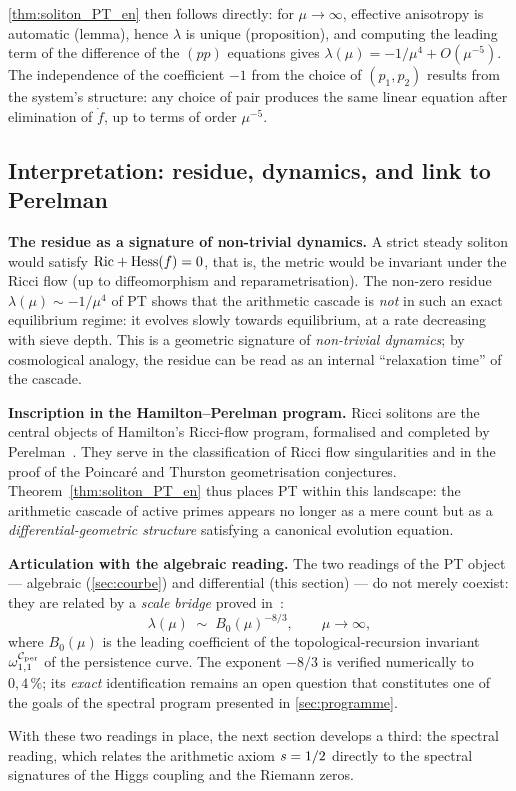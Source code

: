 \ref{thm:soliton_PT_en} then follows directly: for $\mu \to \infty$, effective anisotropy is automatic (lemma), hence $\lambda$ is unique (proposition), and computing the leading term of the difference of the $(pp)$ equations gives $\lambda(\mu) = -1/\mu^{4} + O(\mu^{-5})$. The independence of the coefficient $-1$ from the choice of $(p_1, p_2)$ results from the system's structure: any choice of pair produces the same linear equation after elimination of $\dot f$, up to terms of order $\mu^{-5}$.

\subsection{Interpretation: residue, dynamics, and link to Perelman}
\label{sec:soliton:perelman}

\textbf{The residue as a signature of non-trivial dynamics.}
A strict steady soliton would satisfy $\mathrm{Ric} + \mathrm{Hess}(f) = 0$, that is, the metric would be invariant under the Ricci flow (up to diffeomorphism and reparametrisation). The non-zero residue $\lambda(\mu) \sim -1/\mu^{4}$ of PT shows that the arithmetic cascade is \emph{not} in such an exact equilibrium regime: it evolves slowly towards equilibrium, at a rate decreasing with sieve depth. This is a geometric signature of \emph{non-trivial dynamics}; by cosmological analogy, the residue can be read as an internal ``relaxation time'' of the cascade.

\textbf{Inscription in the Hamilton--Perelman program.}
Ricci solitons are the central objects of Hamilton's Ricci-flow program, formalised and completed by Perelman~\cite{Perelman2002}. They serve in the classification of Ricci flow singularities and in the proof of the Poincaré and Thurston geometrisation conjectures. Theorem~\ref{thm:soliton_PT_en} thus places PT within this landscape: the arithmetic cascade of active primes appears no longer as a mere count but as a \emph{differential-geometric structure} satisfying a canonical evolution equation.

\textbf{Articulation with the algebraic reading.}
The two readings of the PT object --- algebraic (\ref{sec:courbe}) and differential (this section) --- do not merely coexist: they are related by a \emph{scale bridge} proved in~\cite[\S 6]{PT_GeoFlow_RicciSoliton}:
\[
\lambda(\mu) \;\sim\; B_0(\mu)^{-8/3}, \qquad \mu \to \infty,
\]
where $B_0(\mu)$ is the leading coefficient of the topological-recursion invariant $\omega_{1,1}^{\mathcal{C}_{\rm per}}$ of the persistence curve. The exponent $-8/3$ is verified numerically to $0{,}4\,\%$; its \emph{exact} identification remains an open question that constitutes one of the goals of the spectral program presented in \ref{sec:programme}.

With these two readings in place, the next section develops a third: the spectral reading, which relates the arithmetic axiom $s = 1/2$ directly to the spectral signatures of the Higgs coupling and the Riemann zeros.
